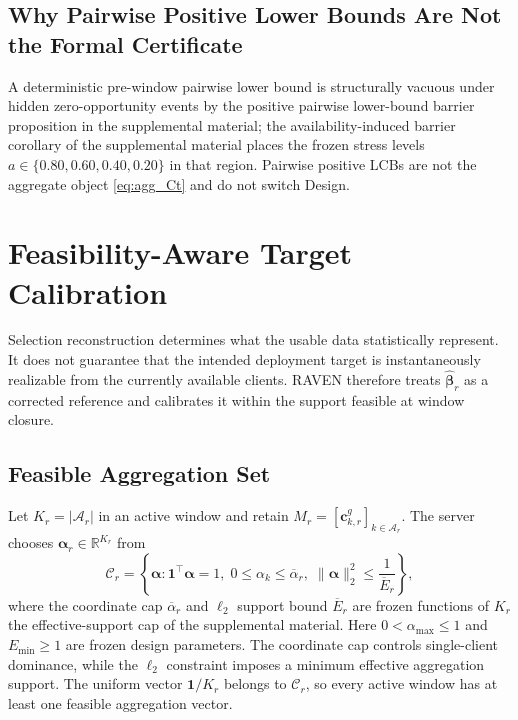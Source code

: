 \documentclass[letterpaper,journal]{IEEEtran}
\begin{document}
\subsection{Why Pairwise Positive Lower Bounds Are Not the Formal Certificate}
\label{subsec:pairwise_barrier}

A deterministic pre-window pairwise lower bound is structurally vacuous
under hidden zero-opportunity events by
the positive pairwise lower-bound barrier proposition in the supplemental material;
the availability-induced barrier corollary of the supplemental material places the frozen stress levels
$a\in\{0.80,0.60,0.40,0.20\}$ in that region.  Pairwise positive LCBs are
not the aggregate object \eqref{eq:agg_Ct} and do not switch Design.


\section{Feasibility-Aware Target Calibration}
\label{sec:calibration}

Selection reconstruction determines what the usable data statistically
represent.  It does not guarantee that the intended deployment target is
instantaneously realizable from the currently available clients.  RAVEN
therefore treats $\widehat{\boldsymbol\beta}_r$ as a corrected reference and
calibrates it within the support feasible at window closure.

\subsection{Feasible Aggregation Set}
\label{subsec:feasible_set}

Let $K_r=|\mathcal{A}_r|$ in an active window and retain
$M_r=[\mathbf{c}^{g}_{k,r}]_{k\in\mathcal{A}_r}$.  The server chooses
$\boldsymbol\alpha_r\in\mathbb{R}^{K_r}$ from
\begin{equation}
 \mathcal{C}_r
 =
 \left\{
 \boldsymbol\alpha:
 \mathbf{1}^{\top}\boldsymbol\alpha=1,\;
 0\le\alpha_k\le\overline\alpha_r,\;
 \|\boldsymbol\alpha\|_2^2\le\frac{1}{\overline E_r}
 \right\},
 \label{eq:Cr}
\end{equation}
where the coordinate cap $\overline\alpha_r$ and $\ell_2$ support bound
$\overline E_r$ are frozen functions of $K_r$
the effective-support cap of the supplemental material.
Here $0<\alpha_{\max}\le1$ and $E_{\min}\ge1$ are frozen design parameters.
The coordinate cap controls single-client dominance, while the
$\ell_2$ constraint imposes a minimum effective aggregation support.  The
uniform vector $\mathbf{1}/K_r$ belongs to $\mathcal{C}_r$, so every active
window has at least one feasible aggregation vector.
\end{document}
